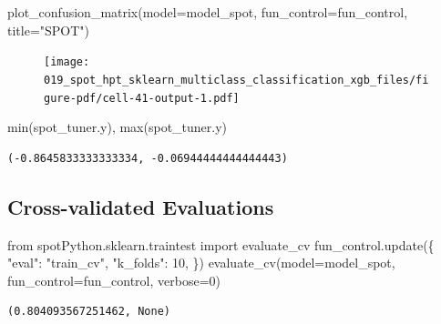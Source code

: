 \documentclass[
  letterpaper,
  DIV=11,
  numbers=noendperiod]{scrreprt}
\newenvironment{Shaded}{\begin{snugshade}}{\end{snugshade}}
\newcommand{\BuiltInTok}[1]{\textcolor[rgb]{0.00,0.23,0.31}{#1}}
\newcommand{\DecValTok}[1]{\textcolor[rgb]{0.68,0.00,0.00}{#1}}
\newcommand{\ImportTok}[1]{\textcolor[rgb]{0.00,0.46,0.62}{#1}}
\newcommand{\NormalTok}[1]{\textcolor[rgb]{0.00,0.23,0.31}{#1}}
\newcommand{\OperatorTok}[1]{\textcolor[rgb]{0.37,0.37,0.37}{#1}}
\newcommand{\StringTok}[1]{\textcolor[rgb]{0.13,0.47,0.30}{#1}}
\begin{document}
\begin{Shaded}
\begin{Highlighting}[]
\NormalTok{plot\_confusion\_matrix(model}\OperatorTok{=}\NormalTok{model\_spot, fun\_control}\OperatorTok{=}\NormalTok{fun\_control, title}\OperatorTok{=}\StringTok{"SPOT"}\NormalTok{)}
\end{Highlighting}
\end{Shaded}

\begin{figure}[H]

{\centering \texttt{[image: 019\_spot\_hpt\_sklearn\_multiclass\_classification\_xgb\_files/figure-pdf/cell-41-output-1.pdf]}

}

\end{figure}

\begin{Shaded}
\begin{Highlighting}[]
\BuiltInTok{min}\NormalTok{(spot\_tuner.y), }\BuiltInTok{max}\NormalTok{(spot\_tuner.y)}
\end{Highlighting}
\end{Shaded}

\begin{verbatim}
(-0.8645833333333334, -0.06944444444444443)
\end{verbatim}

\hypertarget{cross-validated-evaluations-1}{%
\subsection{Cross-validated
Evaluations}\label{cross-validated-evaluations-1}}

\begin{Shaded}
\begin{Highlighting}[]
\ImportTok{from}\NormalTok{ spotPython.sklearn.traintest }\ImportTok{import}\NormalTok{ evaluate\_cv}
\NormalTok{fun\_control.update(\{}
     \StringTok{"eval"}\NormalTok{: }\StringTok{"train\_cv"}\NormalTok{,}
     \StringTok{"k\_folds"}\NormalTok{: }\DecValTok{10}\NormalTok{,}
\NormalTok{\})}
\NormalTok{evaluate\_cv(model}\OperatorTok{=}\NormalTok{model\_spot, fun\_control}\OperatorTok{=}\NormalTok{fun\_control, verbose}\OperatorTok{=}\DecValTok{0}\NormalTok{)}
\end{Highlighting}
\end{Shaded}

\begin{verbatim}
(0.804093567251462, None)
\end{verbatim}
\end{document}
